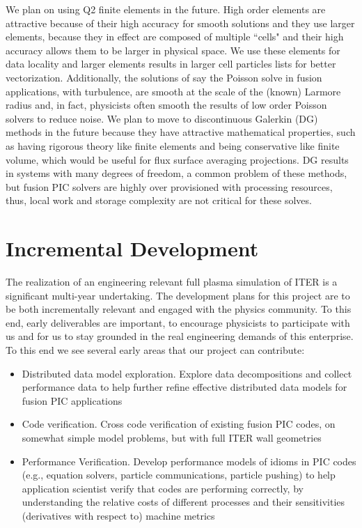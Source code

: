 \documentclass[review]{siamart}
\begin{document}
We plan on using Q2 finite elements in the future.
High order elements are attractive because of their high accuracy for smooth solutions and they use larger elements, because they in effect are composed of multiple ``cells" and their high accuracy allows them to be larger in physical space.
We use these elements for data locality and larger elements results in larger cell particles lists for better vectorization.
Additionally, the solutions of say the Poisson solve in fusion applications, with turbulence, are smooth at the scale of the (known) Larmore radius and, in fact, physicists often smooth the results of low order Poisson solvers to reduce noise.
We plan to move to discontinuous Galerkin (DG) methods in the future because they have attractive mathematical properties, such as having rigorous theory like finite elements and being conservative like finite volume, which would be useful for flux surface averaging projections.
DG results in systems with many degrees of freedom, a common problem of these methods, but fusion PIC solvers are highly over provisioned with processing resources, thus, local work and storage complexity are not critical for these solves.

\section{Incremental Development}

The realization of an engineering relevant full plasma simulation of ITER is a significant multi-year undertaking.
The development plans for this project are to be both incrementally relevant and engaged with the physics community.
To this end, early deliverables are important, to encourage physicists to participate with us and for us to stay grounded in the real engineering demands of this enterprise.
To this end we see several early areas that our project can contribute:
\begin{itemize}
\item Distributed data model exploration. Explore data decompositions and collect performance data to help further refine effective distributed data models for fusion PIC applications
\item Code verification. Cross code verification of existing fusion PIC codes, on somewhat simple model problems, but with full ITER wall geometries
\item Performance Verification.  Develop performance models of idioms in PIC codes (e.g., equation solvers, particle communications, particle pushing) to help application scientist verify that codes are performing correctly, by understanding the relative costs of different processes and their sensitivities (derivatives with respect to) machine metrics
\end{itemize}
 




 
\end{document}
